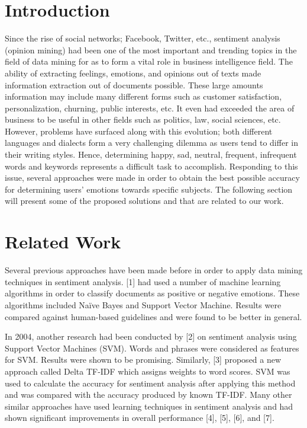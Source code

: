 \documentclass[runningheads,a4paper]{llncs}
\begin{document}
\section{Introduction}
Since the rise of social networks; Facebook, Twitter, etc., sentiment analysis (opinion mining) had been one of the most important and trending topics in the field of data mining for as to form a vital role in business intelligence field. The ability of extracting feelings, emotions, and opinions out of texts made information extraction out of documents possible. These large amounts information may include many different forms such as customer satisfaction, personalization, churning, public interests, etc. It even had exceeded the area of business to be useful in other fields such as politics, law, social sciences, etc.
However, problems have surfaced along with this evolution; both different languages and dialects form a very challenging dilemma as users tend to differ in their writing styles. Hence, determining happy, sad, neutral, frequent, infrequent words and keywords represents a difficult task to accomplish.
Responding to this issue, several approaches were made in order to obtain the best possible accuracy for determining users’ emotions towards specific subjects. The following section will present some of the proposed solutions and that are related to our work.


\section{Related Work}

Several previous approaches have been made before in order to apply data mining techniques in sentiment analysis. [1] had used a number of machine learning algorithms in order to classify documents as positive or negative emotions. These algorithms included Naïve Bayes and Support Vector Machine. Results were compared against human-based guidelines and were found to be better in general.

In 2004, another research had been conducted by [2] on sentiment analysis using Support Vector Machines (SVM). Words and phrases were considered as features for SVM. Results were shown to be promising.
Similarly, [3] proposed a new approach called Delta TF-IDF which assigns weights to word scores. SVM was used to calculate the accuracy for sentiment analysis after applying this method and was compared with the accuracy produced by known TF-IDF.
Many other similar approaches have used learning techniques in sentiment analysis and had shown significant improvements in overall performance [4], [5], [6], and [7].
\end{document}
